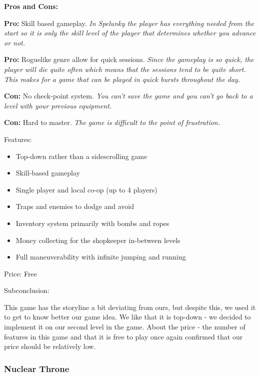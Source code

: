 \documentclass[12p]{article}
\begin{document}
\textbf{Pros and Cons:}

\textbf{Pro:} Skill based gameplay. \emph{In Spelunky the player has everything needed from the start so it is only the skill level of the player that determines whether you advance or not.}

\textbf{Pro:} Roguelike genre allow for quick sessions. \emph{Since the gameplay is so quick, the player will die quite often which means that the sessions tend to be quite short. This makes for a game that can be played in quick bursts throughout the day.}

\textbf{Con:} No check-point system. \emph{You can't save the game and you can't go back to a level with your previous equipment.}

\textbf{Con:} Hard to master. \emph{The game is difficult to the point of frustration.}

\newpage

Features:

\begin{itemize}
 \item Top-down rather than a sidescrolling game
 \item Skill-based gameplay
 \item Single player and local co-op (up to 4 players)
 \item Traps and enemies to dodge and avoid
 \item Inventory system primarily with bombs and ropes
 \item Money collecting for the shopkeeper in-between levels
 \item Full maneuverability with infinite jumping and running
\end{itemize}

Price: Free

Subconclusion:

This game has the storyline a bit deviating from ours, but despite this, we used it to get to know better our game idea. We like that it is top-down - we decided to implement it on our second level in the game. About the price - the number of features in this game and that it is free to play once again confirmed that our price should be relatively low.


\newpage
\subsubsection[Nuclear Throne]{Nuclear Throne \cite{NulcearThrone}}
\end{document}
